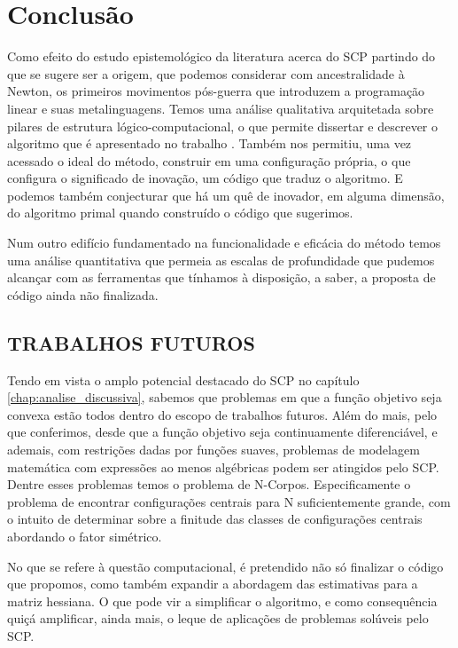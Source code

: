 
\chapter{\larger Conclusão}
\label{chap:conclusao}

Como efeito do estudo epistemológico da literatura acerca do SCP partindo
do que se sugere ser a origem, que podemos considerar com ancestralidade à
Newton, os primeiros movimentos pós-guerra que introduzem a programação linear
e suas metalinguagens. Temos uma análise qualitativa arquitetada sobre pilares
de estrutura lógico-computacional, o que permite dissertar e descrever o
algoritmo que é apresentado no trabalho \cite{Still2010}. Também nos permitiu,
uma vez acessado o ideal do método, construir em uma configuração própria, o
que configura o significado de inovação, um código que traduz o algoritmo.
E podemos também conjecturar que há um quê de inovador, em alguma dimensão,
do algoritmo primal quando construído o código que sugerimos.

Num outro edifício fundamentado na funcionalidade e eficácia do método temos
uma análise quantitativa que permeia as escalas de profundidade que pudemos
alcançar com as ferramentas que tínhamos à disposição, a saber, a proposta de
código ainda não finalizada. 

\section{TRABALHOS FUTUROS}
\label{sec:trabalhosFuturos}

Tendo em vista o amplo potencial destacado do SCP no capítulo
\ref{chap:analise_discussiva}, sabemos que problemas em que a função
objetivo seja convexa estão todos dentro do escopo de trabalhos futuros. Além
do mais, pelo que conferimos, desde que a função objetivo seja continuamente
diferenciável, e ademais, com restrições dadas por funções suaves,
problemas de modelagem matemática com expressões ao menos algébricas podem
ser atingidos pelo SCP. Dentre esses problemas temos o problema de N-Corpos.
Especificamente o problema de encontrar configurações centrais para N
suficientemente grande, com o intuito de determinar sobre a finitude das
classes de configurações centrais abordando o fator simétrico.

No que se refere à questão computacional, é pretendido não só finalizar o
código que propomos, como também expandir a abordagem das estimativas para a
matriz hessiana. O que pode vir a simplificar o algoritmo, e como consequência
quiçá amplificar, ainda mais, o leque de aplicações de problemas solúveis pelo
SCP.

